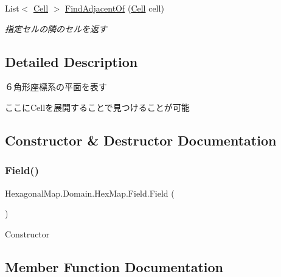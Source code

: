 \begin{DoxyCompactItemize}
List$<$ \mbox{\hyperlink{class_hexagonal_map_1_1_domain_1_1_hex_map_1_1_cell}{Cell}} $>$ \mbox{\hyperlink{class_hexagonal_map_1_1_domain_1_1_hex_map_1_1_field_adf239d99b3cc5b0a8b1b4708fd270f17}{Find\+Adjacent\+Of}} (\mbox{\hyperlink{class_hexagonal_map_1_1_domain_1_1_hex_map_1_1_cell}{Cell}} cell)
\begin{DoxyCompactList}\small\item\em 指定セルの隣のセルを返す \end{DoxyCompactList}\end{DoxyCompactItemize}


\subsection{Detailed Description}
６角形座標系の平面を表す 

ここに\+Cellを展開することで見つけることが可能

\subsection{Constructor \& Destructor Documentation}
\mbox{\label{class_hexagonal_map_1_1_domain_1_1_hex_map_1_1_field_ac69714e5b08a8cdddf5d3a2f3aa27b71}} 
\subsubsection{\texorpdfstring{Field()}{Field()}}
{\footnotesize\ttfamily Hexagonal\+Map.\+Domain.\+Hex\+Map.\+Field.\+Field (\begin{DoxyParamCaption}{ }\end{DoxyParamCaption})\hspace{0.3cm}{\ttfamily [inline]}}



Constructor 



\subsection{Member Function Documentation}
\mbox{\label{class_hexagonal_map_1_1_domain_1_1_hex_map_1_1_field_a44411966c3af9d263987fadf9e122ecc}} 
